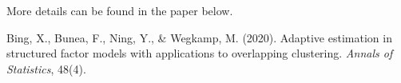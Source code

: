 \documentclass[12pt]{book}
\theoremstyle{definition}
\theoremstyle{remark}
\begin{document}
More details can be found in the paper below.

\begin{referencebox}
    Bing, X., Bunea, F., Ning, Y., \& Wegkamp, M. (2020). Adaptive estimation in structured factor models with applications to overlapping clustering. \textit{Annals of Statistics}, 48(4).
\end{referencebox}
\end{document}
